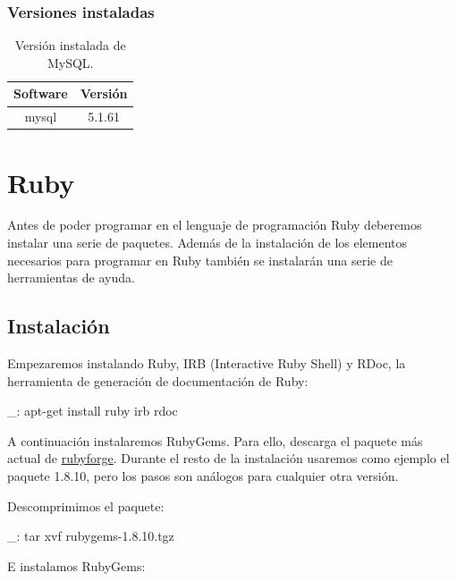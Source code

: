 \subsubsection{Versiones instaladas}

\begin{table}[!htbp]
\centering
   \begin{tabular}{|c|c|}
      \hline
      \textbf{Software} & \textbf{Versión} \\ \hline
      mysql & 5.1.61 \\ \hline
   \end{tabular}
\caption{Versión instalada de MySQL.}
\label{table:web-mysql-versions}
\end{table}


\section{Ruby}
\label{anx:inst-ruby}

Antes de poder programar en el lenguaje de programación Ruby deberemos instalar una serie de paquetes. Además de la instalación de los elementos necesarios para programar en Ruby también se instalarán una serie de herramientas de ayuda.


\subsection{Instalación}

Empezaremos instalando Ruby, IRB (Interactive Ruby Shell) y RDoc, la herramienta de generación de documentación de Ruby:

\begin{bashcode}
_: apt-get install ruby irb rdoc
\end{bashcode}

A continuación instalaremos RubyGems. Para ello, descarga el paquete más actual de \href{http://rubyforge.org/frs/?group_id=126}{rubyforge}. Durante el resto de la instalación usaremos como ejemplo el paquete 1.8.10, pero los pasos son análogos para cualquier otra versión.

Descomprimimos el paquete:

\begin{bashcode}
_: tar xvf rubygems-1.8.10.tgz
\end{bashcode}

E instalamos RubyGems:

